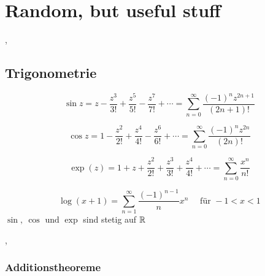 \section{Random, but useful stuff}

\sep
\subsection{Trigonometrie}

\[\sin z = z - \frac{z^3}{3!} + \frac{z^5}{5!} - \frac{z^7}{7!} + \cdots = \sum_{n=0}^\infty \frac{(-1)^n z^{2n + 1}}{(2n + 1)!} \]

\[\cos z = 1 - \frac{z^2}{2!} + \frac{z^4}{4!} - \frac{z^6}{6!} + \cdots = \sum_{n=0}^\infty \frac{(-1)^n z^{2n}}{(2n)!} \]

\[ \exp(z) = 1 + z + \frac{z^2}{2!} + \frac{z^3}{3!}  + \frac{z^4}{4!} + \cdots = \sum_{n=0}^\infty \frac{x^n}{n!} \]

\[ \log(x + 1) = \sum_{n=1}^\infty \frac{(-1)^{n - 1}}{n} x^n \quad \text{ für } -1 < x < 1\]
\Satz[3.8.1] $\sin, \  \cos \text{ und } \exp$ sind stetig auf $\mathbb{R}$

\sep

\subsubsection{Additionstheoreme} 

